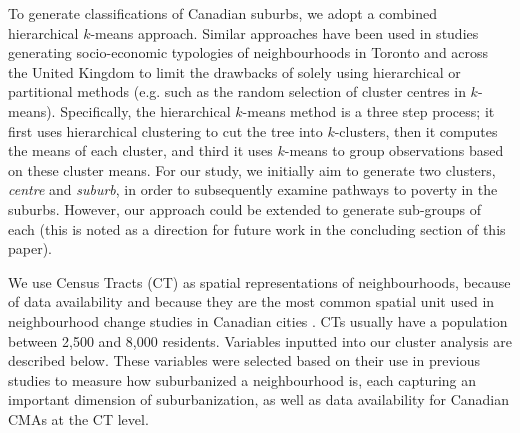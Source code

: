 To generate classifications of Canadian suburbs, we adopt a combined hierarchical $k$-means approach. Similar approaches have been used in studies generating socio-economic typologies of neighbourhoods in Toronto \cite{silver_markov_2021} and across the United Kingdom \cite{vickers_creating_2005} to limit the drawbacks of solely using hierarchical or partitional methods (e.g. such as the random selection of cluster centres in $k$-means).
Specifically, the hierarchical $k$-means method is a three step process; it first uses hierarchical clustering to cut the tree into $k$-clusters, then it computes the means of each cluster, and third it uses $k$-means to group observations based on these cluster means. For our study, we initially aim to generate two clusters, \textit{centre} and \textit{suburb}, in order to subsequently examine pathways to poverty in the suburbs. However, our approach could be extended to generate sub-groups of each (this is noted as a direction for future work in the concluding section of this paper).

We use Census Tracts (CT) as spatial representations of neighbourhoods, because of data availability and because they are the most common spatial unit used in neighbourhood change studies in Canadian cities \cite{allen_new_2018,grant_changing_2020}. CTs usually have a population between 2,500 and 8,000 residents. Variables inputted into our cluster analysis are described below. These variables were selected based on their use in previous studies to measure how suburbanized a neighbourhood is, each capturing an important dimension of suburbanization, as well as data availability for Canadian CMAs at the CT level.

